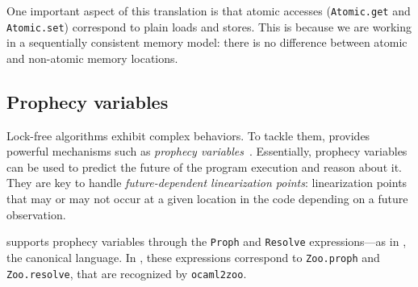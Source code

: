 One important aspect of this translation is that atomic accesses (\texttt{Atomic.get} and \texttt{Atomic.set}) correspond to plain loads and stores.
This is because we are working in a sequentially consistent memory model: there is no difference between atomic and non-atomic memory locations.

\subsection{Prophecy variables}
\label{sec:prophecy}

Lock-free algorithms exhibit complex behaviors.
To tackle them, \Iris provides powerful mechanisms such as \emph{prophecy variables}~\cite{DBLP:journals/pacmpl/JungLPRTDJ20}.
Essentially, prophecy variables can be used to predict the future of the program execution and reason about it.
They are key to handle \emph{future-dependent linearization points}: linearization points that may or may not occur at a given location in the code depending on a future observation.

\Zoo supports prophecy variables through the \texttt{Proph} and \texttt{Resolve} expressions---as in \HeapLang, the canonical \Iris language.
In \OCaml, these expressions correspond to \texttt{Zoo.proph} and \texttt{Zoo.resolve}, that are recognized by \texttt{ocaml2zoo}.
